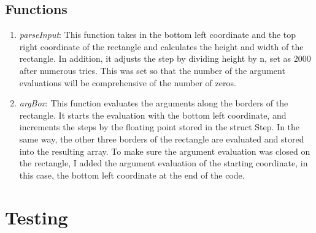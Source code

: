 \documentclass[11pt,reqno,oneside,a4paper]{article}
\begin{document}
\subsection{Functions}
	\begin{enumerate}
		\item \emph{parseInput}: 
		This function takes in the bottom left coordinate and the top right coordinate of the rectangle and calculates the height and width of the rectangle. 
		In addition, it adjusts the step by dividing height by n, set as 2000 after numerous tries. 
		This was set so that the number of the argument evaluations will be comprehensive of the number of zeros.
		
		\item \emph{argBox}:
		This function evaluates the arguments along the borders of the rectangle. 
		It starts the evaluation with the bottom left coordinate, and increments the steps by the floating point stored in the struct Step. 
		In the same way, the other three borders of the rectangle are evaluated and stored into the resulting array. 
		To make sure the argument evaluation was closed on the rectangle, I added the argument evaluation of the starting coordinate, in this case, the bottom left coordinate at the end of the code. 
	\end{enumerate}

\section{Testing}
\end{document}
